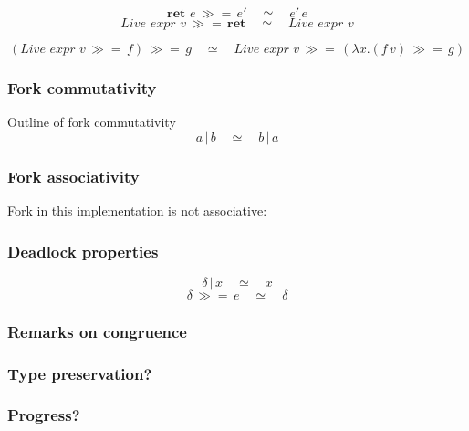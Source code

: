 \documentclass[12pt,twoside,notitlepage]{report}
\begin{document}
\[ \textbf{ret } e\,\gg=\, e'\quad \simeq \quad e'\,e \]
\[  \textit{Live expr }v\,\gg=\, \textbf{ret}\quad \simeq \quad \textit{Live expr }v \]

\[ (\textit{Live expr }v\, \gg=\, f) \, \gg=\, g \quad \simeq \quad \textit{Live expr }v\, \gg=\, (\lambda x. (f\, v) \, \gg=\, g ) \]

\subsubsection{Fork commutativity}
Outline of fork commutativity
\[ a\,|\,b\quad\simeq\quad b \, | \, a \]
\subsubsection{Fork associativity}
Fork in this implementation is not associative:
\subsubsection{Deadlock properties}
\[ \delta \, |\, x \quad \simeq \quad x \]
\[ \delta \, \gg=\, e\quad \simeq \quad \delta \]
\subsubsection{Remarks on congruence}
\subsubsection{Type preservation?}
\subsubsection{Progress?} 

\end{document}
